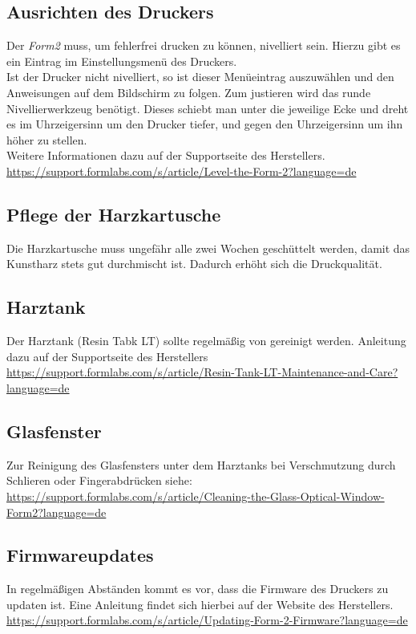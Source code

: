 \documentclass{\basedir/fablab-document}
\begin{document}
\subsection{Ausrichten des Druckers}
Der \textit{Form2} muss, um fehlerfrei drucken zu können, nivelliert sein. Hierzu gibt es ein Eintrag im Einstellungsmenü des Druckers.\\
Ist der Drucker nicht nivelliert, so ist dieser Menüeintrag auszuwählen und den Anweisungen auf dem Bildschirm zu folgen. Zum justieren wird das runde Nivellierwerkzeug benötigt. Dieses schiebt man unter die jeweilige Ecke und dreht es im Uhrzeigersinn um den Drucker tiefer, und gegen den Uhrzeigersinn um ihn höher zu stellen.\\
Weitere Informationen dazu auf der Supportseite des Herstellers.	\\
\url{https://support.formlabs.com/s/article/Level-the-Form-2?language=de}

\subsection{Pflege der Harzkartusche}
Die Harzkartusche muss ungefähr alle zwei Wochen geschüttelt werden, damit das Kunstharz stets gut durchmischt ist. Dadurch erhöht sich die Druckqualität.

\subsection{Harztank}
Der Harztank (Resin Tabk LT) sollte regelmäßig von gereinigt werden. Anleitung dazu auf der Supportseite des Herstellers\\
\url{https://support.formlabs.com/s/article/Resin-Tank-LT-Maintenance-and-Care?language=de}

\subsection{Glasfenster}
Zur Reinigung des Glasfensters unter dem Harztanks bei Verschmutzung durch Schlieren oder Fingerabdrücken siehe:\\ \url{https://support.formlabs.com/s/article/Cleaning-the-Glass-Optical-Window-Form2?language=de}

\subsection{Firmwareupdates}

In regelmäßigen Abständen kommt es vor, dass die Firmware des Druckers zu updaten ist. Eine Anleitung findet sich hierbei auf der Website des Herstellers.\\
\url{https://support.formlabs.com/s/article/Updating-Form-2-Firmware?language=de}

\end{document}
